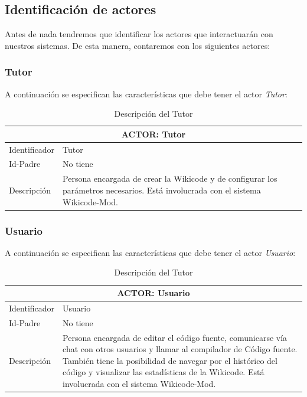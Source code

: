 \subsection{Identificación de actores}

Antes de nada tendremos que identificar los actores que interactuarán con nuestros sistemas. De esta manera, contaremos con los siguientes actores:

\subsubsection{Tutor}

A continuación se especifican las características que debe tener el actor \emph{Tutor}:

\begin{table}[h]
\centering
\begin{tabular}{ | p{} | p{} | }
	\hline
	\multicolumn{2}{|c|}{ACTOR: Tutor} \\
	\hline
	Identificador  & Tutor \\
	\hline 
	Id-Padre & No tiene \\
	\hline
	Descripción & Persona encargada de crear la Wikicode y de configurar los parámetros necesarios. Está involucrada con el sistema Wikicode-Mod.\\
	\hline
\end{tabular}
\caption{Descripción del Tutor}
\end{table}

\subsubsection{Usuario}

A continuación se especifican las características que debe tener el actor \emph{Usuario}:

\begin{table}[h]
\centering
\begin{tabular}{ | p{} | p{} | }
	\hline
	\multicolumn{2}{|c|}{ACTOR: Usuario} \\
	\hline
	Identificador  & Usuario \\
	\hline 
	Id-Padre & No tiene \\
	\hline
	Descripción & Persona encargada de editar el código fuente, comunicarse vía chat con otros usuarios y llamar al compilador de Código fuente. También tiene la posibilidad de navegar por el histórico del código y visualizar las estadísticas de la Wikicode. Está involucrada con el sistema Wikicode-Mod.\\
	\hline
\end{tabular}
\caption{Descripción del Tutor}
\end{table}

